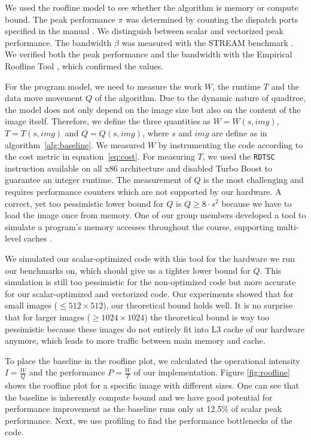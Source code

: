  We used the roofline model \cite{applying-roofline} to see whether the algorithm is memory or
compute bound. The peak performance $\pi$ was determined by counting the dispatch
ports specified in the manual \cite{intel-opt-manual}. We distinguish between scalar and vectorized peak
performance. The bandwidth $\beta$ was measured with the STREAM benchmark \cite{stream}. We verified both the peak
performance and the bandwidth with the Empirical Roofline Tool \cite{ert}, which confirmed the values.

For the program model, we need to measure the work $W$, the runtime $T$ and the data move movement $Q$ of
the algorithm. Due to the dynamic nature of quadtree, the model does not only depend on the image size
but also on the content of the image itself. Therefore, we define the three
quantities as $W=W(s, img)$, $T=T(s, img)$ and $Q=Q(s, img)$, where $s$ and $img$ are define as in algorithm~\ref{alg:baseline}.
We measured $W$ by instrumenting the code according to the cost metric in equation~\eqref{eq:cost}.
For measuring $T$, we used the \texttt{RDTSC} instruction available on all x86 architecture and disabled
Turbo Boost to guarantee an integer runtime. The measurement of $Q$ is the most challenging and requires
performance counters which are not supported by our hardware. A correct, yet too pessimistic lower bound for $Q$
is $Q \geq 8 \cdot s^2$ because we have to load the image once from memory. One of our group members
developed a tool to simulate a program's memory accesses throughout the course, supporting multi-level caches \cite{github-cache}.

We simulated our scalar-optimized code with this tool for the hardware we run our benchmarks on,
which should give us a tighter lower bound for $Q$.
This simulation is still too pessimistic for the non-optimized code but more accurate for our scalar-optimized and vectorized code.
Our experiments showed that for small images ($\leq 512 \times 512$), our theoretical bound holds well.
It is no surprise that for larger images ($\geq 1024 \times 1024$) the theoretical bound is way too pessimistic
because these images do not entirely fit into L3 cache of our hardware anymore, which leads to more traffic between main memory and cache.

To place the baseline in the roofline plot, we calculated the operational
intensity $I=\frac{W}{Q}$ and the performance $P=\frac{W}{T}$ of our
implementation. Figure \ref{fig:roofline} shows the roofline plot for a specific
image with different sizes. One can see that the baseline is inherently compute
bound and we have good potential for performance improvement as the baseline
runs only at 12.5\% of scalar peak performance. Next, we use profiling to find
the performance bottlenecks of the code.

